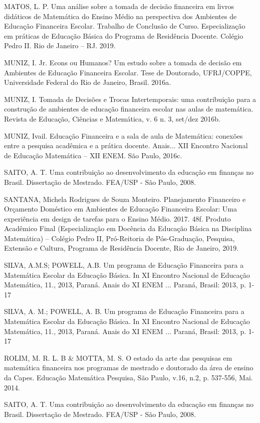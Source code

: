 MATOS, L. P. Uma análise sobre a tomada de decisão financeira em livros didáticos de Matemática do Ensino Médio na perspectiva dos Ambientes de Educação Financeira Escolar. Trabalho de Conclusão de Curso. Especialização em práticas de Educação Básica do Programa de Residência Docente. Colégio Pedro II. Rio de Janeiro – RJ. 2019.

MUNIZ, I. Jr. Econs ou Humanos? Um estudo sobre a tomada de decisão em Ambientes de Educação Financeira Escolar. Tese de Doutorado, UFRJ/COPPE, Universidade Federal do Rio de Janeiro, Brasil. 2016a.

MUNIZ, I. Tomada de Decisões e Trocas Intertemporais: uma contribuição para a construção de ambientes de educação financeira escolar nas aulas de matemática. Revista de Educação, Ciências e Matemática, v. 6 n. 3, set/dez 2016b.

MUNIZ, Ivail. Educação Financeira e a sala de aula de Matemática: conexões entre a pesquisa acadêmica e a prática docente. Anais... XII Encontro Nacional de Educação Matemática – XII ENEM. São Paulo, 2016c.

SAITO, A. T. Uma contribuição ao desenvolvimento da educação em finanças no Brasil. Dissertação de Mestrado. FEA/USP - São Paulo, 2008.

SANTANA, Michela Rodrigues de Souza Monteiro. Planejamento Financeiro e Orçamento Doméstico em Ambientes de Educação Financeira Escolar: Uma experiência em design de tarefas para o Ensino Médio. 2017. 48f. Produto Acadêmico Final (Especialização em Docência da Educação Básica na Disciplina Matemática) – Colégio Pedro II, Pró-Reitoria de Pós-Graduação, Pesquisa, Extensão e Cultura, Programa de Residência Docente, Rio de Janeiro, 2019.

SILVA, A.M.S; POWELL, A.B. Um programa de Educação Financeira para a Matemática Escolar da Educação Básica. In XI Encontro Nacional de Educação Matemática, 11., 2013, Paraná. Anais do XI ENEM ... Paraná, Brasil: 2013, p. 1-17

SILVA, A. M.; POWELL, A. B. Um programa de Educação Financeira para a Matemática Escolar da Educação Básica. In XI Encontro Nacional de Educação Matemática, 11., 2013, Paraná. Anais do XI ENEM ... Paraná, Brasil: 2013, p. 1-17

ROLIM, M. R. L. B \& MOTTA, M. S. O estado da arte das pesquisas em matemática financeira nos programas de mestrado e doutorado da área de ensino da Capes. Educação Matemática Pesquisa, São Paulo, v.16, n.2, p. 537-556, Mai. 2014.

SAITO, A. T. Uma contribuição ao desenvolvimento da educação em finanças no Brasil. Dissertação de Mestrado. FEA/USP - São Paulo, 2008.

